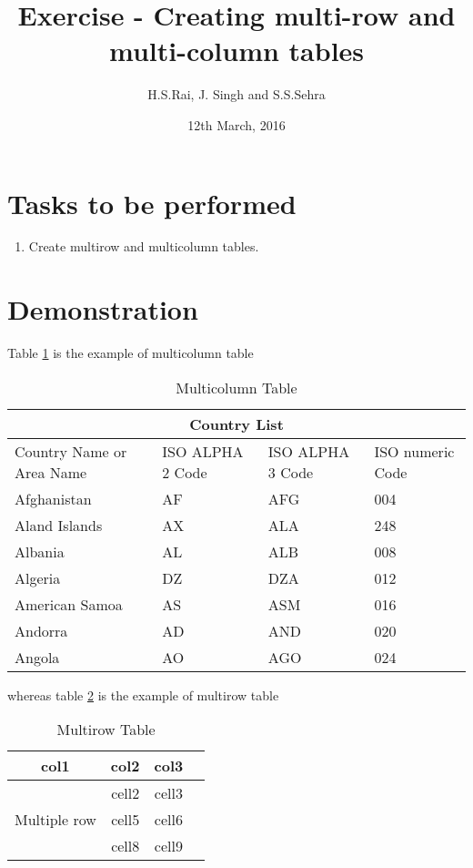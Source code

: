 \documentclass{article}
\title{Exercise  - Creating multi-row and multi-column tables}
\author{H.S.Rai, J. Singh and S.S.Sehra}
\date{12th March, 2016}
\begin{document}
	\maketitle	
	\section*{Tasks to be performed}
	\begin{enumerate}	
		\item Create multirow and multicolumn tables.
	\end{enumerate}
	\section*{Demonstration}
	Table \ref{table:2} is the example of multicolumn table
	\begin{table}[h]
		\centering

	\begin{tabular}{ |p{3cm}||p{3cm}|p{3cm}|p{3cm}|  }
		\hline
		\multicolumn{4}{|c|}{Country List} \\
		\hline
		Country Name     or Area Name& ISO ALPHA 2 Code &ISO ALPHA 3 Code&ISO numeric Code\\
		\hline
		Afghanistan   & AF    &AFG&   004\\
		Aland Islands&   AX  & ALA   &248\\
		Albania &AL & ALB&  008\\
		Algeria    &DZ & DZA&  012\\
		American Samoa&   AS  & ASM&016\\
		Andorra& AD  & AND   &020\\
		Angola& AO  & AGO&024\\
		\hline
		\end{tabular}
		\caption{Multicolumn Table}
		\label{table:2}
			\end{table}
			
	whereas	table \ref{table:3} is the example of multirow table
			\begin{table}[h]
				\centering
			\begin{tabular}{ |c|c|c|c| } 
		\hline
		col1 & col2 & col3 \\
		\hline
		\multirow{3}{4em}{Multiple row} & cell2 & cell3 \\ 
		& cell5 & cell6 \\ 
		& cell8 & cell9 \\ 
		\hline
	\end{tabular}
\caption{Multirow Table}
\label{table:3}
\end{table}
\end{document}
